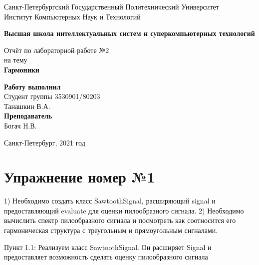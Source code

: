 \documentclass[10pt,a4paper,oneside]{article}
\begin{document}
\begin{titlepage}
\newpage
	\begin{center}
		\Large Санкт-Петербургский Государственный Политехнический Университет\\
		Институт Компьютерных Наук и Технологий\\
	\end{center}
	\begin{center}
		\large\textbf {Высшая школа интеллектуальных систем и суперкомпьютерных технологий}
	\end{center}
	
	\vspace{5em}
	\begin{center}
		\large{Отчёт по лабораторной работе №2 \\ на тему \\
		\textbf{Гармоники} }
	\end{center}
	
	\vspace{25em}
	\begin{flushright}
		\textbf{Работу выполнил\\}Студент группы 3530901/80203 \\ Танашкин В.А. \\
		\textbf{Преподаватель\\}Богач Н.В. 
	\end{flushright}
	
	\vspace{\fill}%
	\begin{center}
	Санкт-Петербург, 2021 год	
	\end{center}
\end{titlepage} %


\section{Упражнение номер №1}
1) Необходимо создать класс SawtoothSignal, расширяющий signal и предоставляющий evaluate для оценки пилообразного сигнала.
2) Необходимо вычислить спектр пилообразного сигнала и посмотреть как соотносится его гармоническая структура с треугольным и прямоугольным сигналами.

Пункт 1.1:
Реализуем класс SawtoothSignal. Он расширяет Signal и предоставляет возможность сделать оценку пилообразного сигнала
\end{document}
